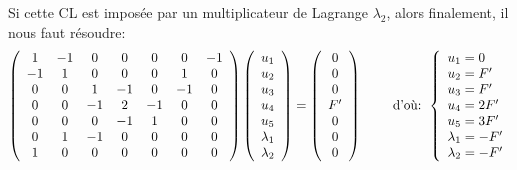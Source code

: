Si cette CL est imposée par un multiplicateur de Lagrange $\lambda_2$, alors finalement, il nous faut
résoudre:
\begin{equation}
\left( \begin{array}{ccccccc} 1&-1&0&0&0&0&-1 \\ -1&1&0&0&0&1&0 \\ 0&0&1&-1&0&-1&0\\ 
0&0&-1&2&-1&0&0\\ 0&0&0&-1&1&0&0 \\ 0&1&-1&0&0&0&0 \\ 1&0&0&0&0&0&0
\end{array}\right)
\left( \begin{array}{c} u_1\\u_2\\u_3\\u_4\\ u_5\\ \lambda_1 \\ \lambda_2 \end{array}\right)
=
\left( \begin{array}{c} 0\\0\\0\\F' \\ 0 \\ 0 \\ 0\end{array}\right)
\qquad \text{ d'où: } 
\left\{\begin{array}{l} u_1=0 \\ u_2=F' \\ u_3=F' \\ u_4=2F' \\ u_5=3F' \\ \lambda_1 = -F' \\ \lambda_2 = -F' \end{array}\right.
\end{equation}


